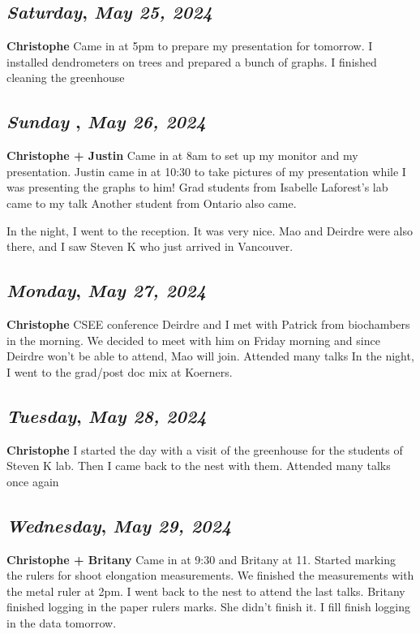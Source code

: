 \def\day{\textit{May 25, 2024}}
\def\weekday{\textit{Saturday}}
\subsection*{\weekday, \day}
\textbf{Christophe}
Came in at 5pm to prepare my presentation for tomorrow. 
I installed dendrometers on trees and prepared a bunch of graphs.
I finished cleaning the greenhouse

\def\day{\textit{May 26, 2024}}
\def\weekday{\textit{Sunday }}
\subsection*{\weekday, \day}
\textbf{Christophe + Justin}
Came in at 8am to set up my monitor and my presentation.
Justin came in at 10:30 to take pictures of my presentation while I was presenting the graphs to him! 
Grad students from Isabelle Laforest's lab came to my talk
Another student from Ontario also came. 

In the night, I went to the reception. It was very nice. Mao and Deirdre were also there, and I saw Steven K who just arrived in Vancouver. 
\def\day{\textit{May 27, 2024}}
\def\weekday{\textit{Monday}}
\subsection*{\weekday, \day}
\textbf{Christophe}
CSEE conference
Deirdre and I met with Patrick from biochambers in the morning. We decided to meet with him on Friday morning and since Deirdre won't be able to attend, Mao will join. 
Attended many talks
In the night, I went to the grad/post doc mix at Koerners. 
\def\day{\textit{May 28, 2024}}
\def\weekday{\textit{Tuesday}}
\subsection*{\weekday, \day}
\textbf{Christophe} 
I started the day with a visit of the greenhouse for the students of Steven K lab. Then I came back to the nest with them.
Attended many talks once again

\def\day{\textit{May 29, 2024}}
\def\weekday{\textit{Wednesday}}
\subsection*{\weekday, \day}
\textbf{Christophe + Britany}
Came in at 9:30 and Britany at 11.
Started marking the rulers for shoot elongation measurements. We finished the measurements with the metal ruler at 2pm. I went back to the nest to attend the last talks. Britany finished logging in the paper rulers marks. She didn't finish it. I fill finish logging in the data tomorrow.

